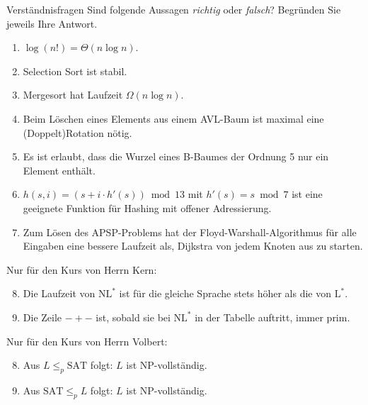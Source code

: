 \documentclass[11pt,a4paper]{article}
\begin{document}
\thispagestyle{empty}
\DeclareRobustCommand{\ttfamily}{\fontencoding{T1}\fontfamily{lmtt}\selectfont}

\newcommand{\quotes}[1]{\glqq{}#1\grqq{}}




\begin{aufgabe}{1}{Verständnisfragen}
    Sind folgende Aussagen \emph{richtig} oder \emph{falsch}?
    Begründen Sie jeweils Ihre Antwort.
    \begin{enumerate}
        \item $\log(n!) = \Theta(n \log n)$.
        \item Selection Sort ist stabil.
        \item Mergesort hat Laufzeit $\Omega(n \log n)$.
        \item Beim Löschen eines Elements aus einem AVL-Baum ist maximal eine (Doppelt)Rotation nötig.
        \item Es ist erlaubt, dass die Wurzel eines B-Baumes der Ordnung 5 nur ein Element enthält.
        \item $h(s, i) = (s + i \cdot h'(s)) \bmod 13$ mit $h'(s) = s \bmod 7$ ist eine geeignete Funktion für Hashing mit offener Adressierung.
        \item Zum Lösen des APSP-Problems hat der Floyd-Warshall-Algorithmus für alle Eingaben eine bessere Laufzeit als, Dijkstra von jedem Knoten aus zu starten.
    \end{enumerate}
    Nur für den Kurs von Herrn Kern:
    \begin{enumerate}
        \setcounter{enumi}{7}
        \item Die Laufzeit von $\mathrm{NL}^*$ ist für die gleiche Sprache stets höher als die von $\mathrm{L}^*$.
        \item Die Zeile $-+-$ ist, sobald sie bei $\mathrm{NL}^*$ in der Tabelle auftritt, immer prim.
    \end{enumerate}
    Nur für den Kurs von Herrn Volbert:
    \begin{enumerate}
        \setcounter{enumi}{7}
        \item Aus $L \leq_p \mathrm{SAT}$ folgt: $L$ ist NP-vollständig.
        \item Aus $\mathrm{SAT} \leq_p L$ folgt: $L$ ist NP-vollständig.
    \end{enumerate}
\end{aufgabe}
\end{document}
